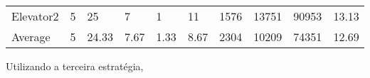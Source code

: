 \documentclass[a4paper]{article}
\begin{document}
\begin{table}[h]
\begin{tabular}{@{}llllllllll@{}}
Elevator2 & 5        & 25            & 7           & 1                                                               & 11                                                                  & 1576                                                         & 13751                                                 & 90953                                                   & 13.13         \\
Average   & 5     & 24.33         & 7.67        & 1.33                                                               & 8.67                                                               & 2304                                                         & 10209                                                 & 74351                                                   &  12.69         \\ \bottomrule
\end{tabular}
\end{table}

Utilizando a terceira estratégia,
\end{document}
